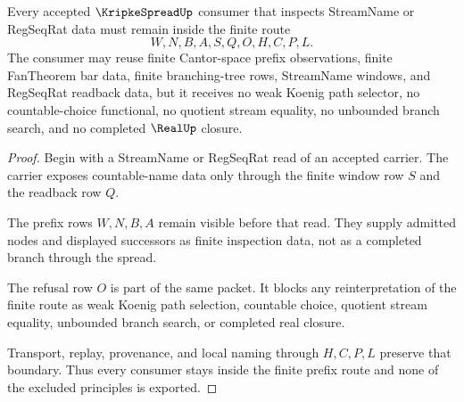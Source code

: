 \begin{theorem}
\label{thm:kripke-spread-prefix-nonescape}
Every accepted $\KripkeSpreadUp$ consumer that inspects StreamName or RegSeqRat data must remain inside the finite route
$$
W,N,B,A,S,Q,O,H,C,P,L .
$$
The consumer may reuse finite Cantor-space prefix observations, finite FanTheorem bar data, finite branching-tree rows, StreamName windows, and RegSeqRat readback data, but it receives no weak Koenig path selector, no countable-choice functional, no quotient stream equality, no unbounded branch search, and no completed $\RealUp$ closure.
\end{theorem}
\begin{proof}
Begin with a StreamName or RegSeqRat read of an accepted carrier. The carrier exposes countable-name data only through the finite window row $S$ and the readback row $Q$.

The prefix rows $W,N,B,A$ remain visible before that read. They supply admitted nodes and displayed successors as finite inspection data, not as a completed branch through the spread.

The refusal row $O$ is part of the same packet. It blocks any reinterpretation of the finite route as weak Koenig path selection, countable choice, quotient stream equality, unbounded branch search, or completed real closure.

Transport, replay, provenance, and local naming through $H,C,P,L$ preserve that boundary. Thus every consumer stays inside the finite prefix route and none of the excluded principles is exported.
\end{proof}




